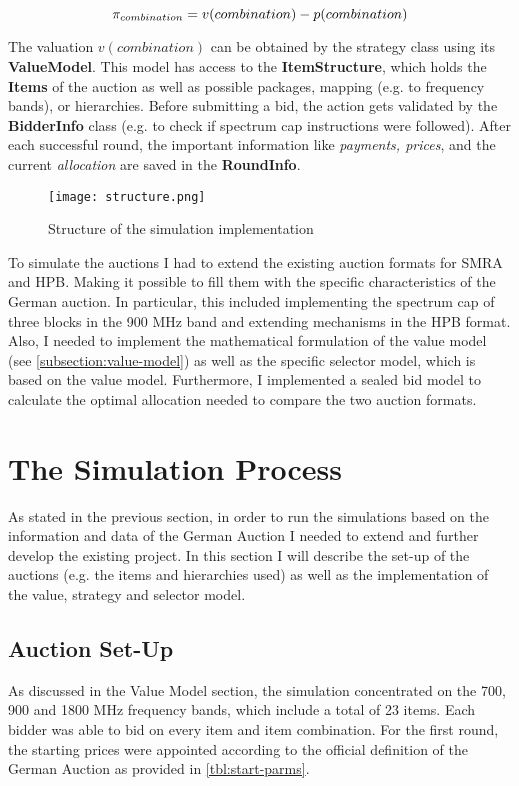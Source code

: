 \begin{equation}
	\centering
	\pi_{combination} = v(combination) - p(combination)
	\label{eq:payoff}
\end{equation}

The valuation $ v(combination) $ can be obtained by the strategy class using its \textbf{ValueModel}. This model has access to the \textbf{ItemStructure}, which holds the \textbf{Items} of the auction as well as possible packages, mapping (e.g. to frequency bands), or hierarchies. Before submitting a bid, the action gets validated by the \textbf{BidderInfo} class (e.g. to check if spectrum cap instructions were followed). After each successful round, the important information like \textit{payments, prices}, and the current \textit{allocation} are saved in the \textbf{RoundInfo}.

\begin{figure}[h]
	\centering
	\texttt{[image: structure.png]}
	\caption{Structure of the simulation implementation} \label{fig:structure-sim}
\end{figure}

To simulate the auctions I had to extend the existing auction formats for SMRA and HPB. Making it possible to fill them with the specific characteristics of the German auction. In particular, this included implementing the spectrum cap of three blocks in the 900 MHz band and extending mechanisms in the HPB format. Also, I needed to implement the mathematical formulation of the value model (see \autoref{subsection:value-model}) as well as the specific selector model, which is based on the value model. Furthermore, I implemented a sealed bid model to calculate the optimal allocation needed to compare the two auction formats.


\section{The Simulation Process}
As stated in the previous section, in order to run the simulations based on the information and data of the German Auction I needed to extend and further develop the existing project. In this section I will describe the set-up of the auctions (e.g. the items and hierarchies used) as well as the implementation of the value, strategy and selector model.

\subsection{Auction Set-Up}
As discussed in the Value Model section, the simulation concentrated on the 700, 900 and 1800 MHz frequency bands, which include a total of 23 items. Each bidder was able to bid on every item and item combination. For the first round, the starting prices were appointed according to the official definition of the German Auction \cite{Bundesnetzagentur2015} as provided in \autoref{tbl:start-parms}.

